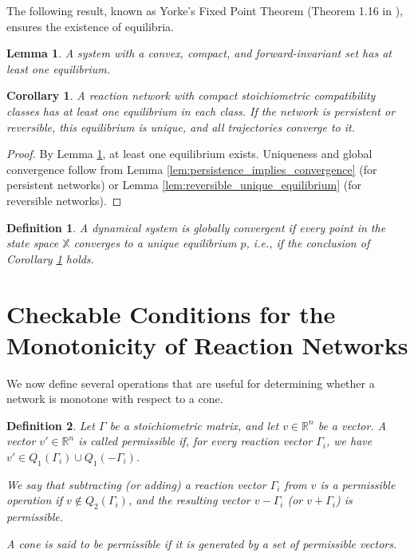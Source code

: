 \documentclass{article}
\newtheorem{cor}{Corollary}
\newtheorem{lem}{Lemma}
\newtheorem{define}{Definition}
\begin{document}
The following result, known as Yorke’s Fixed Point Theorem (Theorem 1.16 in \cite{FB-CTDS}), ensures the existence of equilibria.

\begin{lem}
\label{lem:fixed_point_compact}
A system with a convex, compact, and forward-invariant set has at least one equilibrium.
\end{lem}

\begin{cor}
\label{cor:global fixed point}
A reaction network with compact stoichiometric compatibility classes has at least one equilibrium in each class. If the network is persistent or reversible, this equilibrium is unique, and all trajectories converge to it.
\end{cor}

\begin{proof}
By Lemma \ref{lem:fixed_point_compact}, at least one equilibrium exists. Uniqueness and global convergence follow from Lemma \ref{lem:persistence_implies_convergence} (for persistent networks) or Lemma \ref{lem:reversible_unique_equilibrium} (for reversible networks).
\end{proof}

\begin{define}
A dynamical system is globally convergent if every point in the state space \( \mathbb{X} \) converges to a unique equilibrium \( p \), i.e., if the conclusion of Corollary \ref{cor:global fixed point} holds.
\end{define}



\section{Checkable Conditions for the Monotonicity of Reaction Networks}
\label{sec:algo for cones}
 We now define several operations that are useful for determining whether a network is monotone with respect to a cone.

\begin{define}
Let \( \Gamma \) be a stoichiometric matrix, and let \( v \in \mathbb{R}^n \) be a vector. A vector \( v' \in \mathbb{R}^n \) is called \textit{permissible} if, for every reaction vector \( \Gamma_i \), we have \( v' \in Q_1(\Gamma_i) \cup Q_1(-\Gamma_i) \).

We say that subtracting (or adding) a reaction vector \( \Gamma_i \) from \( v \) is a \textit{permissible operation} if \( v \notin Q_2(\Gamma_i) \), and the resulting vector \( v - \Gamma_i \) (or \( v + \Gamma_i \)) is permissible.

A cone is said to be \textit{permissible} if it is generated by a set of permissible vectors.


\end{define}
\end{document}
